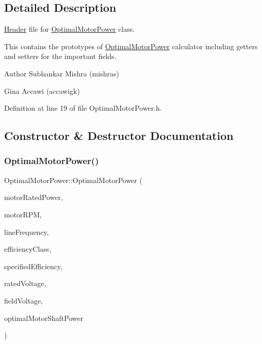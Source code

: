 \subsection{Detailed Description}
\hyperlink{class_header}{Header} file for \hyperlink{class_optimal_motor_power}{Optimal\+Motor\+Power} class. 

This contains the prototypes of \hyperlink{class_optimal_motor_power}{Optimal\+Motor\+Power} calculator including getters and setters for the important fields.

\begin{DoxyAuthor}{Author}
Subhankar Mishra (mishras) 

Gina Accawi (accawigk) 
\end{DoxyAuthor}


Definition at line 19 of file Optimal\+Motor\+Power.\+h.



\subsection{Constructor \& Destructor Documentation}
\mbox{\label{class_optimal_motor_power_a36017bbd359437ce77c1e18dc2377961}} 
\subsubsection{\texorpdfstring{Optimal\+Motor\+Power()}{OptimalMotorPower()}}
{\footnotesize\ttfamily Optimal\+Motor\+Power\+::\+Optimal\+Motor\+Power (\begin{DoxyParamCaption}\item[{double}]{motor\+Rated\+Power,  }\item[{double}]{motor\+R\+PM,  }\item[{Motor\+::\+Line\+Frequency}]{line\+Frequency,  }\item[{Motor\+::\+Efficiency\+Class}]{efficiency\+Class,  }\item[{double}]{specified\+Efficiency,  }\item[{double}]{rated\+Voltage,  }\item[{double}]{field\+Voltage,  }\item[{double}]{optimal\+Motor\+Shaft\+Power }\end{DoxyParamCaption})\hspace{0.3cm}{\ttfamily [inline]}}

